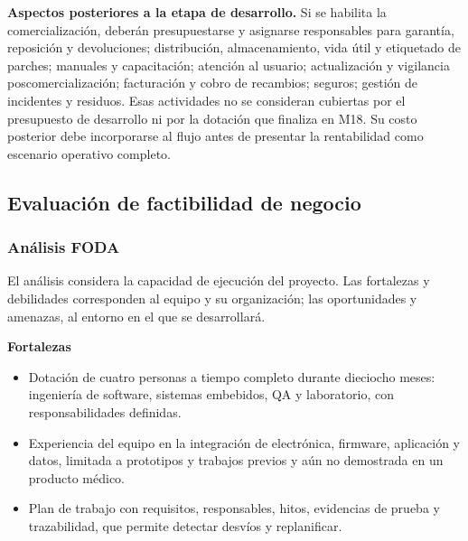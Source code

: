 \noindent\textbf{Aspectos posteriores a la etapa de desarrollo.} Si se habilita la comercialización, deberán presupuestarse y asignarse responsables para garantía, reposición y devoluciones; distribución, almacenamiento, vida útil y etiquetado de parches; manuales y capacitación; atención al usuario; actualización y vigilancia poscomercialización; facturación y cobro de recambios; seguros; gestión de incidentes y residuos. Esas actividades no se consideran cubiertas por el presupuesto de desarrollo ni por la dotación que finaliza en M18. Su costo posterior debe incorporarse al flujo antes de presentar la rentabilidad como escenario operativo completo.

\subsection{Evaluación de factibilidad de negocio}







\subsubsection{Análisis FODA}




El análisis considera la capacidad de ejecución del proyecto. Las fortalezas y debilidades corresponden al equipo y su organización; las oportunidades y amenazas, al entorno en el que se desarrollará.

\noindent\textbf{Fortalezas}
\begin{itemize}
    \item Dotación de cuatro personas a tiempo completo durante dieciocho meses: ingeniería de software, sistemas embebidos, QA y laboratorio, con responsabilidades definidas.
    \item Experiencia del equipo en la integración de electrónica, firmware, aplicación y datos, limitada a prototipos y trabajos previos y aún no demostrada en un producto médico.
    \item Plan de trabajo con requisitos, responsables, hitos, evidencias de prueba y trazabilidad, que permite detectar desvíos y replanificar.
\end{itemize}


